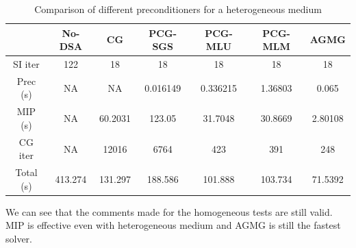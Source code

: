 \begin{table}[H]
  \begin{center}
    \caption{Comparison of different preconditioners for a heterogeneous medium}
    \begin{tabular}{|c|c|c|c|c|c|c|}
      \hline
      & No-DSA & CG & PCG-SGS & PCG-MLU & PCG-MLM & AGMG\\
      \hline
      SI iter   & 122      & 18      & 18       & 18       & 18      & 18 \\
      Prec (s)  & NA       & NA      & 0.016149 & 0.336215 & 1.36803 & 0.065 \\
      MIP (s)   & NA       & 60.2031 & 123.05   & 31.7048  & 30.8669 & 2.80108\\
      CG iter   & NA       & 12016   & 6764     & 423      & 391     & 248 \\
      Total (s) & 413.274  & 131.297 & 188.586  & 101.888  & 103.734 & 71.5392\\
      \hline
    \end{tabular}
    \label{tab_4}
  \end{center}
\end{table}
We can see that the comments made for the homogeneous tests are
still valid. MIP is effective even with heterogeneous medium and AGMG is
still the fastest solver.

